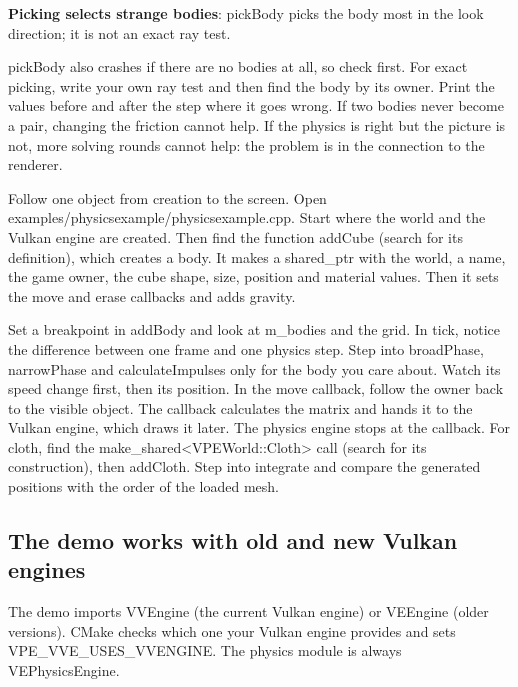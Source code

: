 \documentclass[11pt,a4paper]{article}
\begin{document}
\textbf{Picking selects strange bodies}: pickBody picks the body most in the look direction; it is not an exact ray test.

pickBody also crashes if there are no bodies at all, so check first. For exact picking, write your own ray test and then find the body by its owner. Print the values before and after the step where it goes wrong. If two bodies never become a pair, changing the friction cannot help. If the physics is right but the picture is not, more solving rounds cannot help: the problem is in the connection to the renderer.

\label{vpe-core-30}
Follow one object from creation to the screen. Open examples/physicsexample/physicsexample.cpp. Start where the world and the Vulkan engine are created. Then find the function addCube (search for its definition), which creates a body. It makes a shared\_ptr with the world, a name, the game owner, the cube shape, size, position and material values. Then it sets the move and erase callbacks and adds gravity.

\begin{center}\end{center}

Set a breakpoint in addBody and look at m\_bodies and the grid. In tick, notice the difference between one frame and one physics step. Step into broadPhase, narrowPhase and calculateImpulses only for the body you care about. Watch its speed change first, then its position. In the move callback, follow the owner back to the visible object. The callback calculates the matrix and hands it to the Vulkan engine, which draws it later. The physics engine stops at the callback. For cloth, find the make\_shared<VPEWorld::Cloth> call (search for its construction), then addCloth. Step into integrate and compare the generated positions with the order of the loaded mesh.

\subsection*{The demo works with old and new Vulkan engines}
The demo imports VVEngine (the current Vulkan engine) or VEEngine (older versions). CMake checks which one your Vulkan engine provides and sets VPE\_VVE\_USES\_VVENGINE. The physics module is always VEPhysicsEngine.
\end{document}
